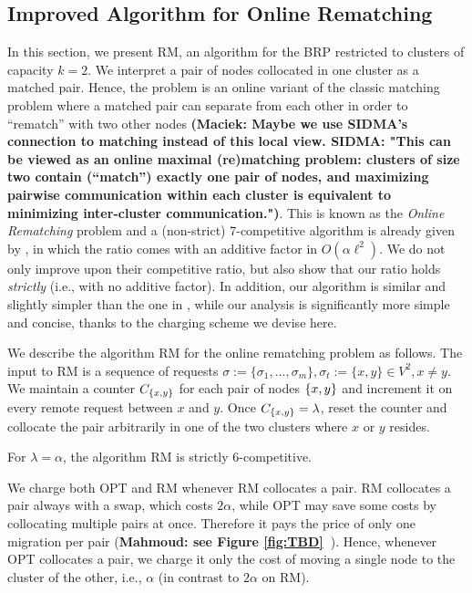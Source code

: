 \documentclass[a4paper,anonymous,USenglish]{lipics-v2019}
\newcommand{\OPT}{\textsc{OPT}\xspace}
\newcommand{\OBRP}{BRP\xspace}
\newcommand{\RM}{\textsc{RM}\xspace} %
\DeclarePairedDelimiter\set{\{}{\}}
\newcommand\mahmoud[1]{\color{orange}\textbf{Mahmoud: #1~}\color{black}}
\newcommand\maciek[1]{\color{brown}\textbf{(Maciek: #1)}\color{black}}
\begin{document}
\subsection{Improved Algorithm for Online Rematching} \label{sec:k2}
In this section,
we present \RM,
 an algorithm for the \OBRP restricted to clusters of capacity $k=2$.
We interpret a pair of nodes collocated in one cluster as a matched pair.
Hence,
the problem is an online variant of the classic matching problem where
a matched pair can separate from each other in order to ``rematch'' with two other nodes
\maciek{Maybe we use SIDMA's connection to matching instead of this local view. SIDMA: "This can be viewed as an online maximal (re)matching problem: clusters of size two contain (“match”) exactly one pair of nodes, and maximizing pairwise communication within each cluster is equivalent to minimizing inter-cluster communication."}.
This is known as the  \emph{Online Rematching} 
problem and a (non-strict) 7-competitive algorithm is already given by \cite{repartition-disc},
in which the ratio comes with an additive factor in $O(\alpha\ell^2)$.
We do not only improve upon their competitive ratio,
but also show that our ratio holds \emph{strictly}
(i.e., with no additive factor).
In addition,
our algorithm is similar
and slightly simpler than the one in \cite{repartition-disc}, 
while our analysis is significantly more simple and concise,
thanks to the charging scheme we devise here.


We describe the algorithm \RM for the online rematching problem as follows.
The input to \RM is a sequence of  requests
$\sigma:=\{\sigma_1,\dots, \sigma_m\}, \sigma_t:=\{x,y\} \in V^2, x \neq y$.
We maintain a counter $C_{\set{x,y}}$ for each pair of nodes $\set{x,y}$ and increment it on every remote request between $x$ and $y$.
Once $C_{\set{x,y}} = \lambda$,
reset the counter and collocate the pair arbitrarily in one of the two clusters where $x$ or $y$ resides.

\begin{theorem} \label{thm:k=2}
	For $\lambda=\alpha$, the algorithm \RM  is strictly 6-competitive.
\end{theorem}


We charge both \OPT and \RM whenever \RM collocates a pair.%
\RM collocates a pair always with a swap,%
which  costs $2\alpha$,
while OPT may save some costs by collocating multiple pairs at once.
 Therefore it pays the price of only one migration per pair  (\mahmoud{see Figure \ref{fig:TBD}}).
Hence,
whenever \OPT collocates a pair,
we charge it only the cost of moving a single node to the cluster of the other,
i.e., $\alpha$ (in contrast to $2\alpha$ on \RM).
\end{document}
